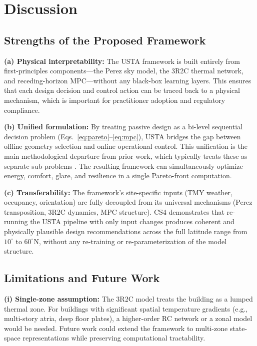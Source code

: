 \documentclass[preprint,12pt]{elsarticle}
\begin{document}
\section{Discussion}
\label{sec:discussion}

\subsection{Strengths of the Proposed Framework}

\textbf{(a) Physical interpretability:} The USTA framework is built entirely from first-principles components---the Perez sky model, the 3R2C thermal network, and receding-horizon MPC---without any black-box learning layers. This ensures that each design decision and control action can be traced back to a physical mechanism, which is important for practitioner adoption and regulatory compliance.

\textbf{(b) Unified formulation:} By treating passive design as a bi-level sequential decision problem (Eqs.~\eqref{eq:pareto}--\eqref{eq:mpc}), USTA bridges the gap between offline geometry selection and online operational control. This unification is the main methodological departure from prior work, which typically treats these as separate sub-problems \cite{kirimtat2016,drgona2020}. The resulting framework can simultaneously optimize energy, comfort, glare, and resilience in a single Pareto-front computation.

\textbf{(c) Transferability:} The framework's site-specific inputs (TMY weather, occupancy, orientation) are fully decoupled from its universal mechanisms (Perez transposition, 3R2C dynamics, MPC structure). CS4 demonstrates that re-running the USTA pipeline with only input changes produces coherent and physically plausible design recommendations across the full latitude range from $10^\circ$ to $60^\circ$N, without any re-training or re-parameterization of the model structure.

\subsection{Limitations and Future Work}

\textbf{(i) Single-zone assumption:} The 3R2C model treats the building as a lumped thermal zone. For buildings with significant spatial temperature gradients (e.g., multi-story atria, deep floor plates), a higher-order RC network or a zonal model would be needed. Future work could extend the framework to multi-zone state-space representations while preserving computational tractability.
\end{document}
